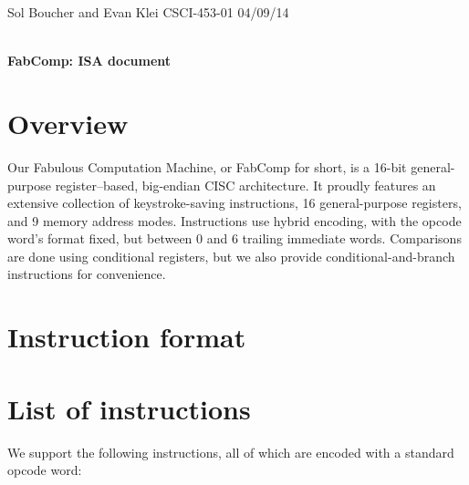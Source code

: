 \documentclass[12pt]{article}
\begin{document}
\begin{framed}
\noindent
Sol Boucher and Evan Klei \hfill CSCI-453-01 \hfill 04/09/14 \\
\vspace{6pt} \\
\centerline{\textbf{\huge FabComp: ISA document}}
\end{framed}

\section{Overview}
Our Fabulous Computation Machine, or FabComp for short, is a 16-bit general-purpose register--based, big-endian CISC architecture.
It proudly features an extensive collection of keystroke-saving instructions, 16 general-purpose registers, and 9 memory address modes.
Instructions use hybrid encoding, with the opcode word's format fixed, but between 0 and 6 trailing immediate words.
Comparisons are done using conditional registers, but we also provide conditional-and-branch instructions for convenience.

\section{Instruction format}

\section{List of instructions}
We support the following instructions, all of which are encoded with a standard opcode word:
\end{document}
